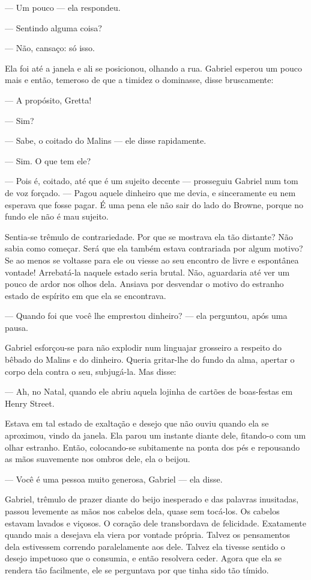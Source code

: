 --- Um pouco --- ela respondeu.

--- Sentindo alguma coisa?

--- Não, cansaço: só isso.

Ela foi até a janela e ali se posicionou, olhando a rua.  Gabriel esperou um
pouco mais e então, temeroso de que a timidez o dominasse, disse bruscamente:

--- A propósito, Gretta!

--- Sim?

--- Sabe, o coitado do Malins --- ele disse rapidamente.

--- Sim. O que tem ele?

--- Pois é, coitado, até que é um sujeito decente --- prosseguiu Gabriel num
tom de voz forçado.  --- Pagou aquele dinheiro que me devia, e sinceramente eu
nem esperava que fosse pagar.  É uma pena ele não sair do lado do Browne,
porque no fundo ele não é mau sujeito.

Sentia-se trêmulo de contrariedade.  Por que se mostrava ela tão distante?  Não
sabia como começar.  Será que ela também estava contrariada por algum motivo?
Se ao menos se voltasse para ele ou viesse ao seu encontro de livre e
espontânea vontade!  Arrebatá-la naquele estado seria brutal.  Não, aguardaria
até ver um pouco de ardor nos olhos dela.  Ansiava por desvendar o motivo do
estranho estado de espírito em que ela se encontrava.

--- Quando foi que você lhe emprestou dinheiro? --- ela perguntou, após uma
pausa.

Gabriel esforçou-se para não explodir num linguajar grosseiro a respeito do
bêbado do Malins e do dinheiro.  Queria gritar-lhe do fundo da alma, apertar o
corpo dela contra o seu, subjugá-la.  Mas disse:

--- Ah, no Natal, quando ele abriu aquela lojinha de cartões de boas-festas em
Henry Street.

Estava em tal estado de exaltação e desejo que não ouviu quando ela se
aproximou, vindo da janela.  Ela parou um instante diante dele, fitando-o com
um olhar estranho.  Então, colocando-se subitamente na ponta dos pés e
repousando as mãos suavemente nos ombros dele, ela o beijou.

--- Você é uma pessoa muito generosa, Gabriel --- ela disse.

Gabriel, trêmulo de prazer diante do beijo inesperado e das palavras
inusitadas, passou levemente as mãos nos cabelos dela, quase sem tocá-los.  Os
cabelos estavam lavados e viçosos.  O coração dele transbordava de felicidade.
Exatamente quando mais a desejava ela viera por vontade própria.  Talvez os
pensamentos dela estivessem correndo paralelamente aos dele.  Talvez ela
tivesse sentido o desejo impetuoso que o consumia, e então resolvera ceder.
Agora que ela se rendera tão facilmente, ele se perguntava por que tinha sido
tão tímido.

